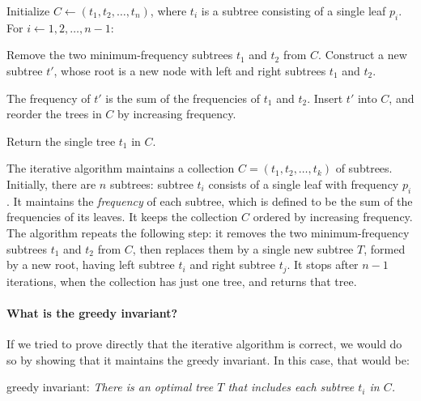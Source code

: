 \newcommand{\iHuffman}{\textsf{iHuffman}\xspace}

\begin{samepage}
  \begin{myframed}
    \begin{steps}
    \item[$\iHuffman\big(p=(p_1,p_2,\ldots,p_n)\big)$:]
      \step Initialize $C\leftarrow(t_1, t_2, \ldots, t_n)$,
      where $t_i$ is a subtree consisting of a single leaf $p_i$.
      \step For $i\leftarrow 1,2,\ldots,n-1$:
      \begin{block}
        \step Remove the two minimum-frequency subtrees $t_1$ and $t_2$ from $C$.
        \step Construct a new subtree $t'$,
        whose root is a new node with left and right subtrees $t_1$ and $t_2$.

        The frequency of $t'$ is the sum of the frequencies of $t_1$ and $t_2$.
        \step Insert $t'$ into $C$, and reorder the trees in $C$ by increasing frequency.
      \end{block}
      \step Return the single tree $t_1$ in $C$.
    \end{steps}
  \end{myframed}
\end{samepage}

The iterative algorithm maintains a collection $C=(t_1, t_2, \ldots, t_k)$ of subtrees.
Initially, there are $n$ subtrees: subtree $t_i$ consists of a single leaf with frequency $p_i$.
It maintains the \emph{frequency} of each subtree,
which is defined to be the sum of the frequencies of its leaves.
It keeps the collection $C$ ordered by increasing frequency.
The algorithm repeats the following step:
it removes the two minimum-frequency subtrees $t_1$ and $t_2$ from $C$,
then replaces them by a single new subtree $T$,
formed by a new root, having left subtree $t_i$ and right subtree $t_j$.
It stops after $n-1$ iterations,
when the collection has just one tree, and returns that tree.

\paragraph{What is the greedy invariant?}
If we tried to prove directly that the iterative algorithm is correct,
we would do so by showing that it maintains the greedy invariant.
In this case, that would be:

\centerline{{\sf greedy invariant:}
  \emph{There is an optimal tree $T$ that includes each subtree $t_i$ in $C$.}}

